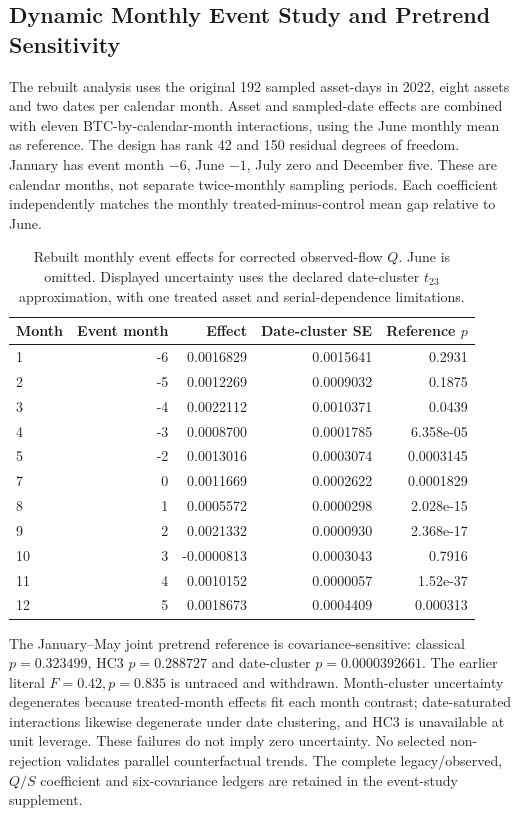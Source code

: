 \documentclass[12pt]{article}
\theoremstyle{definition}
\theoremstyle{remark}
\begin{document}
\subsection{Dynamic Monthly Event Study and Pretrend Sensitivity}
The rebuilt analysis uses the original 192 sampled asset-days in 2022, eight assets and two dates per calendar month. Asset and sampled-date effects are combined with eleven BTC-by-calendar-month interactions, using the June monthly mean as reference. The design has rank 42 and 150 residual degrees of freedom. January has event month $-6$, June $-1$, July zero and December five. These are calendar months, not separate twice-monthly sampling periods. Each coefficient independently matches the monthly treated-minus-control mean gap relative to June.

\begin{table}[htbp]
\centering\footnotesize
\caption{Rebuilt monthly event effects for corrected observed-flow $Q$. June is omitted. Displayed uncertainty uses the declared date-cluster $t_{23}$ approximation, with one treated asset and serial-dependence limitations.}
\label{tab:dynamic_event_study}
\begin{tabular}{lrrrr}\toprule
Month & Event month & Effect & Date-cluster SE & Reference $p$ \\\midrule
1 & -6 & 0.0016829 & 0.0015641 & 0.2931 \\
2 & -5 & 0.0012269 & 0.0009032 & 0.1875 \\
3 & -4 & 0.0022112 & 0.0010371 & 0.0439 \\
4 & -3 & 0.0008700 & 0.0001785 & 6.358e-05 \\
5 & -2 & 0.0013016 & 0.0003074 & 0.0003145 \\
7 & 0 & 0.0011669 & 0.0002622 & 0.0001829 \\
8 & 1 & 0.0005572 & 0.0000298 & 2.028e-15 \\
9 & 2 & 0.0021332 & 0.0000930 & 2.368e-17 \\
10 & 3 & -0.0000813 & 0.0003043 & 0.7916 \\
11 & 4 & 0.0010152 & 0.0000057 & 1.52e-37 \\
12 & 5 & 0.0018673 & 0.0004409 & 0.000313 \\
\bottomrule\end{tabular}
\end{table}

The January--May joint pretrend reference is covariance-sensitive: classical $p=0.323499$, HC3 $p=0.288727$ and date-cluster $p=0.0000392661$. The earlier literal $F=0.42,p=0.835$ is untraced and withdrawn. Month-cluster uncertainty degenerates because treated-month effects fit each month contrast; date-saturated interactions likewise degenerate under date clustering, and HC3 is unavailable at unit leverage. These failures do not imply zero uncertainty. No selected non-rejection validates parallel counterfactual trends. The complete legacy/observed, $Q/S$ coefficient and six-covariance ledgers are retained in the event-study supplement.
\end{document}
